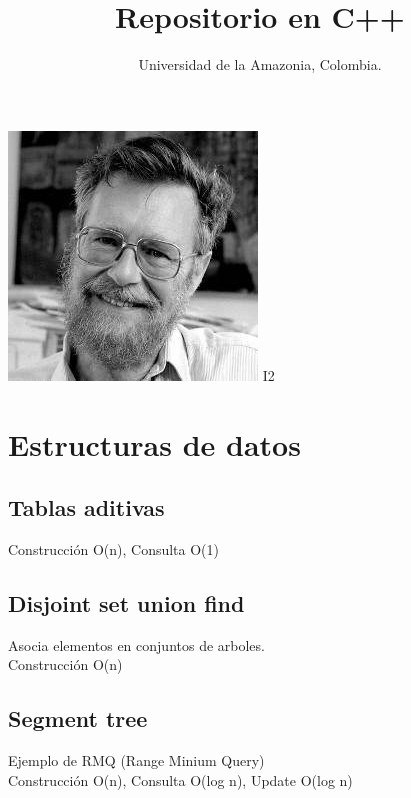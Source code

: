 \documentclass[10pt,landscape,twocolumn,a4paper,notitlepage]{article}
\newcommand\cppfile[2][]{

}
\begin{document}
	
	\title{Repositorio en C++}
	\author{Universidad de la Amazonia, Colombia.}
	\maketitle
	
	\begin{center}
		\includegraphics[scale=0.9]{dijkstra}
		\Huge{I2}
	\end{center}
	\normalsize
	\tableofcontents
	\hfill
	
		\section{Estructuras de datos}
			\subsection{Tablas aditivas}
			Construcción O(n), Consulta O(1)
			\cppfile[16-33]{estructuras_de_datos/tablas_aditivas.cpp}
			\subsection{Disjoint set union find}
			Asocia elementos en conjuntos de arboles.\\
			Construcción O(n)
			\cppfile[7-44]{estructuras_de_datos/disjoint_set_union_find.cpp}
			\subsection{Segment tree}
			Ejemplo de RMQ (Range Minium Query)\\
			Construcción O(n), Consulta O(log n), Update O(log n)
			\cppfile[8-68]{estructuras_de_datos/segment_tree.cpp}%
\end{document}
